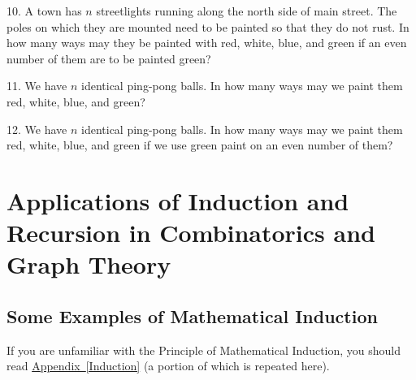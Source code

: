 \documentclass[10pt,]{book}
\theoremstyle{plain}
\theoremstyle{definition}
\theoremstyle{definition}
\numberwithin{equation}{chapter}
\begin{document}
\begin{exerciselist}
\par\smallskip
\item[10.]\marginsymbol[-1em]{} \hypertarget{exercise-10}{}\hypertarget{p-428}{}%
A town has \(n\) streetlights running along the north side of main street.  The poles on which they are mounted need to be painted so that they do not rust.  In how many ways may they be painted with red, white, blue, and green if an even number of them are to be painted green?%
\par\smallskip
\item[11.] \hypertarget{pingpongpaint}{}\hypertarget{p-430}{}%
We have \(n\) identical ping-pong balls.  In how many ways may we paint them red, white, blue, and green?%
\par\smallskip
\item[12.] \hypertarget{exercise-12}{}\hypertarget{p-432}{}%
We have \(n\) identical ping-pong balls.  In how many ways may we paint them red, white, blue, and green if we use green paint on an even number of them?%
\par\smallskip
\end{exerciselist}
\typeout{************************************************}
\typeout{************************************************}
\chapter[{Applications of Induction and Recursion in Combinatorics and Graph Theory}]{Applications of Induction and Recursion in Combinatorics and Graph Theory}\label{InductionRecursion}
\typeout{************************************************}
\typeout{************************************************}
\section[{Some Examples of Mathematical Induction}]{Some Examples of Mathematical Induction}\label{sec_induction-examples}
\hypertarget{p-434}{}%
If you are unfamiliar with the Principle of Mathematical Induction, you should read \hyperref[Induction]{Appendix~\ref{Induction}} (a portion of which is repeated here).%
\typeout{************************************************}
\typeout{************************************************}
\end{document}

